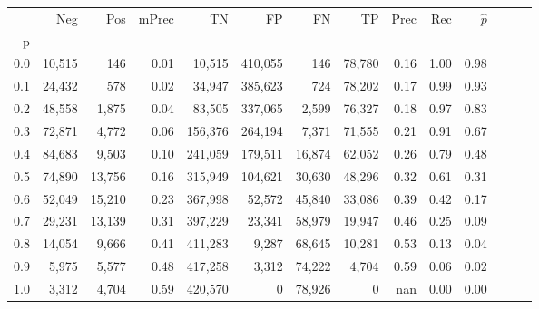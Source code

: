 \begin{tabular}{rrrrrrrrrrrrrr}
\toprule
{} &     Neg &     Pos & mPrec &       TN &       FP &      FN &      TP &  Prec &   Rec & $\hat{p}$ \\
p   &         &         &       &          &          &         &         &       &       &           \\
\midrule
0.0 &  10,515 &     146 &  0.01 &   10,515 &  410,055 &     146 &  78,780 &  0.16 &  1.00 &      0.98 \\
0.1 &  24,432 &     578 &  0.02 &   34,947 &  385,623 &     724 &  78,202 &  0.17 &  0.99 &      0.93 \\
0.2 &  48,558 &   1,875 &  0.04 &   83,505 &  337,065 &   2,599 &  76,327 &  0.18 &  0.97 &      0.83 \\
0.3 &  72,871 &   4,772 &  0.06 &  156,376 &  264,194 &   7,371 &  71,555 &  0.21 &  0.91 &      0.67 \\
0.4 &  84,683 &   9,503 &  0.10 &  241,059 &  179,511 &  16,874 &  62,052 &  0.26 &  0.79 &      0.48 \\
0.5 &  74,890 &  13,756 &  0.16 &  315,949 &  104,621 &  30,630 &  48,296 &  0.32 &  0.61 &      0.31 \\
0.6 &  52,049 &  15,210 &  0.23 &  367,998 &   52,572 &  45,840 &  33,086 &  0.39 &  0.42 &      0.17 \\
0.7 &  29,231 &  13,139 &  0.31 &  397,229 &   23,341 &  58,979 &  19,947 &  0.46 &  0.25 &      0.09 \\
0.8 &  14,054 &   9,666 &  0.41 &  411,283 &    9,287 &  68,645 &  10,281 &  0.53 &  0.13 &      0.04 \\
0.9 &   5,975 &   5,577 &  0.48 &  417,258 &    3,312 &  74,222 &   4,704 &  0.59 &  0.06 &      0.02 \\
1.0 &   3,312 &   4,704 &  0.59 &  420,570 &        0 &  78,926 &       0 &   nan &  0.00 &      0.00 \\
\bottomrule
\end{tabular}
